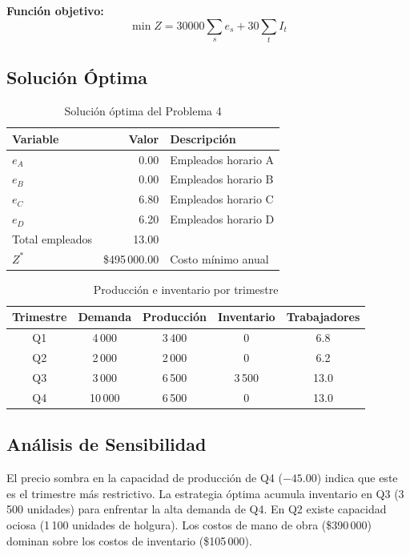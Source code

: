 \documentclass[12pt,a4paper]{article}
\begin{document}
\textbf{Función objetivo:}
\[
\min Z = 30000 \sum_{s} e_s + 30 \sum_{t} I_t
\]

\subsection{Solución Óptima}

\begin{table}[h]
\centering
\begin{tabular}{lrl}
\toprule
\textbf{Variable} & \textbf{Valor} & \textbf{Descripción} \\
\midrule
$e_A$ & 0.00 & Empleados horario A \\
$e_B$ & 0.00 & Empleados horario B \\
$e_C$ & 6.80 & Empleados horario C \\
$e_D$ & 6.20 & Empleados horario D \\
Total empleados & 13.00 & \\
$Z^*$ & \$495\,000.00 & Costo mínimo anual \\
\bottomrule
\end{tabular}
\caption{Solución óptima del Problema 4}
\end{table}

\begin{table}[h]
\centering
\begin{tabular}{ccccc}
\toprule
\textbf{Trimestre} & \textbf{Demanda} & \textbf{Producción} & \textbf{Inventario} & \textbf{Trabajadores} \\
\midrule
Q1 & 4\,000 & 3\,400 & 0 & 6.8 \\
Q2 & 2\,000 & 2\,000 & 0 & 6.2 \\
Q3 & 3\,000 & 6\,500 & 3\,500 & 13.0 \\
Q4 & 10\,000 & 6\,500 & 0 & 13.0 \\
\bottomrule
\end{tabular}
\caption{Producción e inventario por trimestre}
\end{table}

\subsection{Análisis de Sensibilidad}

El precio sombra en la capacidad de producción de Q4 ($-45.00$) indica que este es el trimestre más restrictivo. La estrategia óptima acumula inventario en Q3 (3\,500 unidades) para enfrentar la alta demanda de Q4. En Q2 existe capacidad ociosa (1\,100 unidades de holgura). Los costos de mano de obra (\$390\,000) dominan sobre los costos de inventario (\$105\,000).
\end{document}
